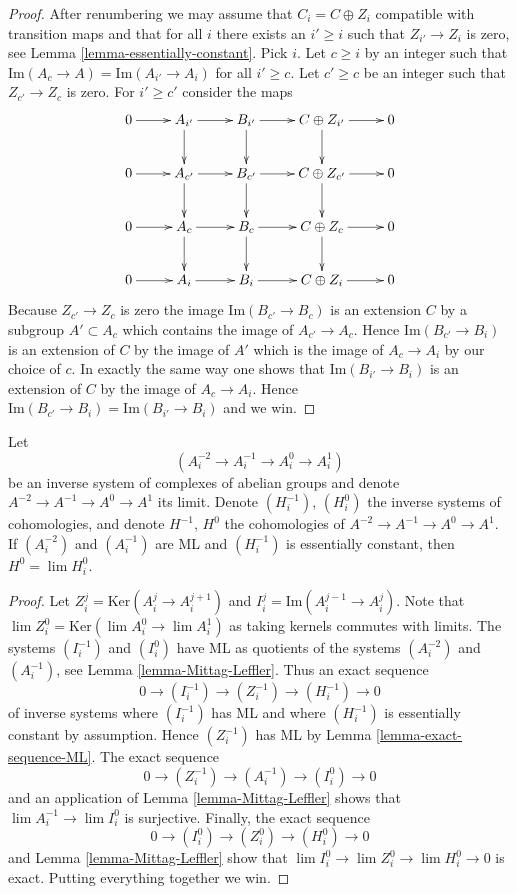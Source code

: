 \begin{proof}
After renumbering we may assume that $C_i = C \oplus Z_i$ compatible with
transition maps and that for all $i$ there exists an $i' \geq i$ such that
$Z_{i'} \to Z_i$ is zero, see
Lemma \ref{lemma-essentially-constant}.
Pick $i$. Let $c \geq i$ by an integer such that
$\text{Im}(A_c \to A) = \text{Im}(A_{i'} \to A_i)$
for all $i' \geq c$. Let $c' \geq c$ be an integer such that
$Z_{c'} \to Z_c$ is zero. For $i' \geq c'$ consider the maps
$$
\xymatrix{
0 \ar[r] & A_{i'} \ar[d] \ar[r] & B_{i'} \ar[d] \ar[r] &
C \oplus Z_{i'} \ar[d] \ar[r] & 0 \\
0 \ar[r] & A_{c'} \ar[d] \ar[r] & B_{c'} \ar[d] \ar[r] &
C \oplus Z_{c'} \ar[d]\ar[r] & 0  \\
0 \ar[r] & A_c \ar[d] \ar[r] & B_c \ar[d] \ar[r] &
C \oplus Z_c \ar[d]\ar[r] & 0  \\
0 \ar[r] & A_i \ar[r] & B_i \ar[r] & C \oplus Z_i \ar[r] & 0
}
$$
Because $Z_{c'} \to Z_c$ is zero the image $\text{Im}(B_{c'} \to B_c)$
is an extension $C$ by a subgroup $A' \subset A_c$ which
contains the image of $A_{c'} \to A_c$. Hence $\text{Im}(B_{c'} \to B_i)$
is an extension of $C$ by the image of $A'$ which is the image of
$A_c \to A_i$ by our choice of $c$. In exactly the same way one shows
that $\text{Im}(B_{i'} \to B_i)$ is an extension of $C$ by
the image of $A_c \to A_i$. Hence
$\text{Im}(B_{c'} \to B_i) = \text{Im}(B_{i'} \to B_i)$ and we win.
\end{proof}

\begin{lemma}
\label{lemma-apply-Mittag-Leffler-again}
Let
$$
(A^{-2}_i \to A^{-1}_i \to A^0_i \to A^1_i)
$$
be an inverse system of complexes of abelian groups and denote
$A^{-2} \to A^{-1} \to A^0 \to A^1$ its limit. Denote
$(H_i^{-1})$, $(H_i^0)$ the inverse systems of cohomologies, and
denote $H^{-1}$, $H^0$ the cohomologies of $A^{-2} \to A^{-1} \to A^0 \to A^1$.
If $(A^{-2}_i)$ and $(A^{-1}_i)$ are ML and
$(H^{-1}_i)$ is essentially constant, then
$H^0 = \lim H_i^0$.
\end{lemma}

\begin{proof}
Let $Z^j_i = \text{Ker}(A^j_i \to A^{j + 1}_i)$ and
$I^j_i = \text{Im}(A^{j - 1}_i \to A^j_i)$.
Note that $\lim Z^0_i = \text{Ker}(\lim A^0_i \to \lim A^1_i)$ as
taking kernels commutes with limits.
The systems $(I^{-1}_i)$ and $(I^0_i)$ have ML as quotients of
the systems $(A^{-2}_i)$ and $(A^{-1}_i)$, see
Lemma \ref{lemma-Mittag-Leffler}.
Thus an exact sequence
$$
0 \to (I^{-1}_i) \to (Z^{-1}_i) \to (H^{-1}_i) \to 0
$$
of inverse systems where $(I^{-1}_i)$ has ML
and where $(H^{-1}_i)$ is essentially constant by assumption.
Hence $(Z^{-1}_i)$ has ML by
Lemma \ref{lemma-exact-sequence-ML}.
The exact sequence
$$
0 \to (Z^{-1}_i) \to (A^{-1}_i) \to (I^0_i) \to 0
$$
and an application of
Lemma \ref{lemma-Mittag-Leffler}
shows that $\lim A^{-1}_i \to \lim I^0_i$ is surjective.
Finally, the exact sequence
$$
0 \to (I^0_i) \to (Z^0_i) \to (H^0_i) \to 0
$$
and
Lemma \ref{lemma-Mittag-Leffler}
show that $\lim I^0_i \to \lim Z^0_i \to \lim H^0_i \to 0$
is exact. Putting everything together we win.
\end{proof}



